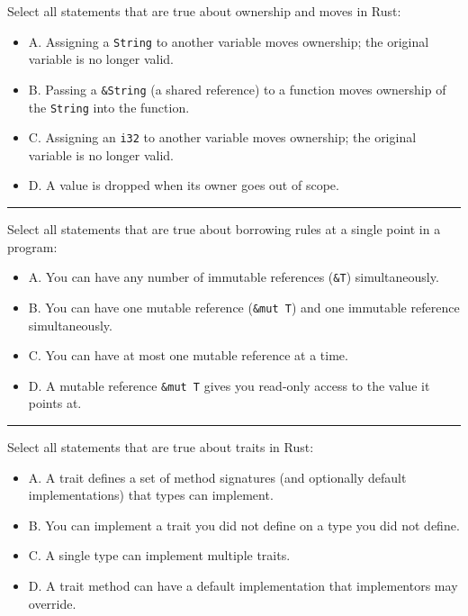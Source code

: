 \documentclass[
  11pt,
]{article}
\providecommand{\tightlist}{%
  \setlength{\itemsep}{0pt}\setlength{\parskip}{0pt}}
\begin{document}
Select all statements that are true about ownership and moves in Rust:

\begin{itemize}
\tightlist
\item[$\square$]
  A. Assigning a \texttt{String} to another variable moves ownership;
  the original variable is no longer valid.
\item[$\square$]
  B. Passing a \texttt{\&String} (a shared reference) to a function
  moves ownership of the \texttt{String} into the function.
\item[$\square$]
  C. Assigning an \texttt{i32} to another variable moves ownership; the
  original variable is no longer valid.
\item[$\square$]
  D. A value is dropped when its owner goes out of scope.
\end{itemize}

\begin{center}\rule{0.5\linewidth}{0.5pt}\end{center}

Select all statements that are true about borrowing rules at a single
point in a program:

\begin{itemize}
\tightlist
\item[$\square$]
  A. You can have any number of immutable references (\texttt{\&T})
  simultaneously.
\item[$\square$]
  B. You can have one mutable reference (\texttt{\&mut\ T}) and one
  immutable reference simultaneously.
\item[$\square$]
  C. You can have at most one mutable reference at a time.
\item[$\square$]
  D. A mutable reference \texttt{\&mut\ T} gives you read-only access to
  the value it points at.
\end{itemize}

\begin{center}\rule{0.5\linewidth}{0.5pt}\end{center}

Select all statements that are true about traits in Rust:

\begin{itemize}
\tightlist
\item[$\square$]
  A. A trait defines a set of method signatures (and optionally default
  implementations) that types can implement.
\item[$\square$]
  B. You can implement a trait you did not define on a type you did not
  define.
\item[$\square$]
  C. A single type can implement multiple traits.
\item[$\square$]
  D. A trait method can have a default implementation that implementors
  may override.
\end{itemize}
\end{document}
